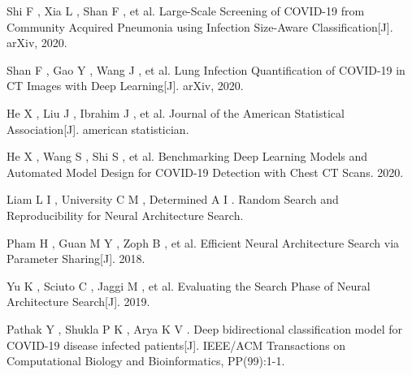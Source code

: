 \documentclass[journal,twoside,web]{ieeecolor}
\begin{document}
\begin{thebibliography}{00}
     Shi F ,  Xia L ,  Shan F , et al. Large-Scale Screening of COVID-19 from Community Acquired Pneumonia using Infection Size-Aware Classification[J]. arXiv, 2020.
    
     Shan F ,  Gao Y ,  Wang J , et al. Lung Infection Quantification of COVID-19 in CT Images with Deep Learning[J]. arXiv, 2020.
    
     He X ,  Liu J ,  Ibrahim J , et al. Journal of the American Statistical Association[J]. american statistician.
    
     He X ,  Wang S ,  Shi S , et al. Benchmarking Deep Learning Models and Automated Model Design for COVID-19 Detection with Chest CT Scans.  2020.
    
     Liam L I ,  University C M ,  Determined A I . Random Search and Reproducibility for Neural Architecture Search.
    
     Pham H ,  Guan M Y ,  Zoph B , et al. Efficient Neural Architecture Search via Parameter Sharing[J].  2018.
    
     Yu K ,  Sciuto C ,  Jaggi M , et al. Evaluating the Search Phase of Neural Architecture Search[J].  2019.
    
     Pathak Y ,  Shukla P K ,  Arya K V . Deep bidirectional classification model for COVID-19 disease infected patients[J]. IEEE/ACM Transactions on Computational Biology and Bioinformatics, PP(99):1-1.
    
\end{thebibliography}
\end{document}
